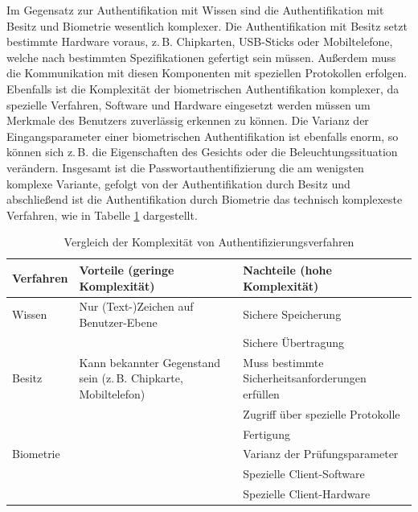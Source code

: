 \documentclass[11pt,a4paper,ngerman]{scrreprt}
\begin{document}
Im Gegensatz zur Authentifikation mit Wissen sind die Authentifikation mit Besitz und Biometrie wesentlich komplexer. Die Authentifikation mit Besitz setzt bestimmte Hardware voraus, z.\,B. Chipkarten, USB-Sticks oder Mobiltelefone, welche nach bestimmten Spezifikationen gefertigt sein müssen. Außerdem muss die Kommunikation mit diesen Komponenten mit speziellen Protokollen erfolgen. Ebenfalls ist die Komplexität der biometrischen Authentifikation komplexer, da spezielle Verfahren, Software und Hardware eingesetzt werden müssen um Merkmale des Benutzers zuverlässig erkennen zu können. Die Varianz der Eingangsparameter einer biometrischen Authentifikation ist ebenfalls enorm, so können sich z.\,B. die Eigenschaften des Gesichts oder die Beleuchtungssituation verändern. Insgesamt ist die Passwortauthentifizierung die am wenigsten komplexe Variante, gefolgt von der Authentifikation durch Besitz und abschließend ist die Authentifikation durch Biometrie das technisch komplexeste Verfahren, wie in Tabelle \ref{table:Komplexität} dargestellt.
\begin{table}[htbp]
    \begin{tabularx}{\textwidth}{ lXX }
        \toprule
        Verfahren & Vorteile (geringe Komplexität) & Nachteile (hohe Komplexität) \\ 
        \midrule
        Wissen & Nur (Text-)Zeichen auf Benutzer-Ebene & Sichere Speicherung \\
         & & Sichere Übertragung \\
        \midrule
        Besitz & Kann bekannter Gegenstand sein (z.\,B. Chipkarte, Mobiltelefon) & Muss bestimmte Sicherheitsanforderungen erfüllen \\
         & & Zugriff über spezielle Protokolle \\
         & & Fertigung \\
        \midrule
        Biometrie & & Varianz der Prüfungsparameter \\
         & & Spezielle Client-Software \\
         & & Spezielle Client-Hardware \\
        \bottomrule
    \end{tabularx}
    \caption{Vergleich der Komplexität von Authentifizierungsverfahren}
    \label{table:Komplexität}
\end{table}
\end{document}
